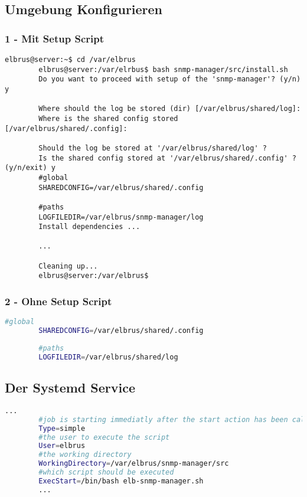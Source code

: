 	\subsection[file config]{Umgebung Konfigurieren}
	\subsubsection{1 - Mit Setup Script}
	
	\lstset{style=commands}
	\begin{lstlisting}[caption={Ausführen des 'install.sh' Scripts.}]
		elbrus@server:~$ cd /var/elbrus
		elbrus@server:/var/elrbus$ bash snmp-manager/src/install.sh
		Do you want to proceed with setup of the 'snmp-manager'? (y/n) y
		
		Where should the log be stored (dir) [/var/elbrus/shared/log]:
		Where is the shared config stored [/var/elbrus/shared/.config]:
		
		Should the log be stored at '/var/elbrus/shared/log' ?
		Is the shared config stored at '/var/elbrus/shared/.config' ? (y/n/exit) y
		#global
		SHAREDCONFIG=/var/elbrus/shared/.config
		
		#paths
		LOGFILEDIR=/var/elbrus/snmp-manager/log
		Install dependencies ...
		
		...
		
		Cleaning up...
		elbrus@server:/var/elbrus$
	\end{lstlisting}
	
	\subsubsection{2 - Ohne Setup Script}
	
	\lstset{style=files}
	\begin{lstlisting}[caption={Anhand von '.env.example' eigene '.env' Datei anlegen.}, language=bash, keywords={CONFIGPATH, MAINPATH}, keywordstyle=\color{red}]
		#global
		SHAREDCONFIG=/var/elbrus/shared/.config
		
		#paths
		LOGFILEDIR=/var/elbrus/shared/log
	\end{lstlisting}
	\newpage
	
	\subsection[systemd service]{Der Systemd Service}
	
	\lstset{style=files}
	\begin{lstlisting}[caption={snmp-manager.service.example - Die Variable 'WorkingDirectory' sowie die Variable 'User' anpassen.},language=bash ,keywords={WorkingDirectory, User}, keywordstyle=\color{red}, firstnumber=5]
		...
		#job is starting immediatly after the start action has been called
		Type=simple
		#the user to execute the script
		User=elbrus
		#the working directory
		WorkingDirectory=/var/elbrus/snmp-manager/src
		#which script should be executed
		ExecStart=/bin/bash elb-snmp-manager.sh
		...
	\end{lstlisting}
	
